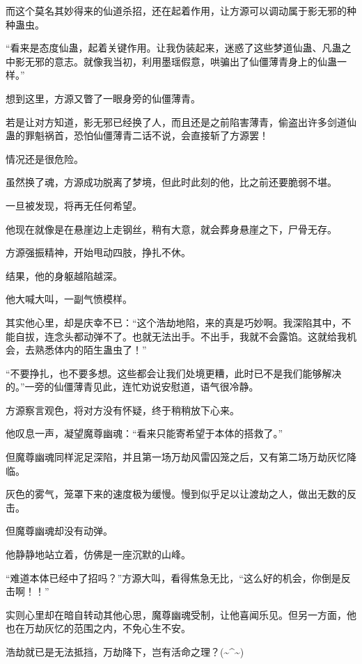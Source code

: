 \begin{this_body}
而这个莫名其妙得来的仙道杀招，还在起着作用，让方源可以调动属于影无邪的种种蛊虫。

“看来是态度仙蛊，起着关键作用。让我伪装起来，迷惑了这些梦道仙蛊、凡蛊之中影无邪的意志。就像我当初，利用墨瑶假意，哄骗出了仙僵薄青身上的仙蛊一样。”

想到这里，方源又瞥了一眼身旁的仙僵薄青。

若是让对方知道，影无邪已经换了人，而且还是之前陷害薄青，偷盗出许多剑道仙蛊的罪魁祸首，恐怕仙僵薄青二话不说，会直接斩了方源罢！

情况还是很危险。

虽然换了魂，方源成功脱离了梦境，但此时此刻的他，比之前还要脆弱不堪。

一旦被发现，将再无任何希望。

他现在就像是在悬崖边上走钢丝，稍有大意，就会葬身悬崖之下，尸骨无存。

方源强振精神，开始甩动四肢，挣扎不休。

结果，他的身躯越陷越深。

他大喊大叫，一副气愤模样。

其实他心里，却是庆幸不已：“这个浩劫地陷，来的真是巧妙啊。我深陷其中，不能自拔，连念头都动弹不了。也就无法出手。不出手，我就不会露馅。这就给我机会，去熟悉体内的陌生蛊虫了！”

“不要挣扎，也不要多想。这些都会让我们处境更糟，此时已不是我们能够解决的。”一旁的仙僵薄青见此，连忙劝说安慰道，语气很冷静。

方源察言观色，将对方没有怀疑，终于稍稍放下心来。

他叹息一声，凝望魔尊幽魂：“看来只能寄希望于本体的搭救了。”

但魔尊幽魂同样泥足深陷，并且第一场万劫风雷囚笼之后，又有第二场万劫灰忆降临。

灰色的雾气，笼罩下来的速度极为缓慢。慢到似乎足以让渡劫之人，做出无数的反击。

但魔尊幽魂却没有动弹。

他静静地站立着，仿佛是一座沉默的山峰。

“难道本体已经中了招吗？”方源大叫，看得焦急无比，“这么好的机会，你倒是反击啊！！”

实则心里却在暗自转动其他心思，魔尊幽魂受制，让他喜闻乐见。但另一方面，他也在万劫灰忆的范围之内，不免心生不安。

浩劫就已是无法抵挡，万劫降下，岂有活命之理？(\~{}\^{}\~{})

\end{this_body}

